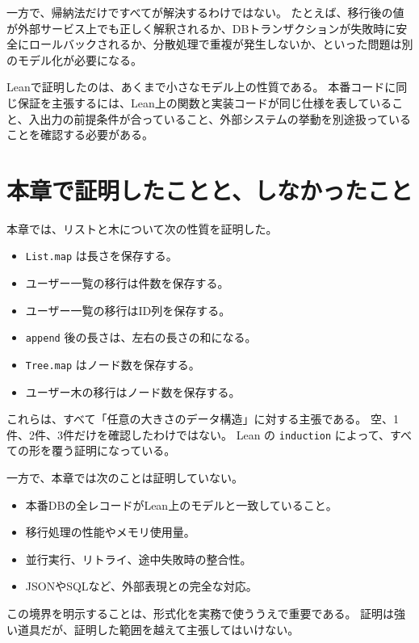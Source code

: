 一方で、帰納法だけですべてが解決するわけではない。
たとえば、移行後の値が外部サービス上でも正しく解釈されるか、DBトランザクションが失敗時に安全にロールバックされるか、分散処理で重複が発生しないか、といった問題は別のモデル化が必要になる。

\begin{warningbox}
Leanで証明したのは、あくまで小さなモデル上の性質である。
本番コードに同じ保証を主張するには、Lean上の関数と実装コードが同じ仕様を表していること、入出力の前提条件が合っていること、外部システムの挙動を別途扱っていることを確認する必要がある。
\end{warningbox}

\section{本章で証明したことと、しなかったこと}

本章では、リストと木について次の性質を証明した。

\begin{itemize}
\item \texttt{List.map} は長さを保存する。
\item ユーザー一覧の移行は件数を保存する。
\item ユーザー一覧の移行はID列を保存する。
\item \texttt{append} 後の長さは、左右の長さの和になる。
\item \texttt{Tree.map} はノード数を保存する。
\item ユーザー木の移行はノード数を保存する。
\end{itemize}

これらは、すべて「任意の大きさのデータ構造」に対する主張である。
空、1件、2件、3件だけを確認したわけではない。
Lean の \texttt{induction} によって、すべての形を覆う証明になっている。

一方で、本章では次のことは証明していない。

\begin{itemize}
\item 本番DBの全レコードがLean上のモデルと一致していること。
\item 移行処理の性能やメモリ使用量。
\item 並行実行、リトライ、途中失敗時の整合性。
\item JSONやSQLなど、外部表現との完全な対応。
\end{itemize}

この境界を明示することは、形式化を実務で使ううえで重要である。
証明は強い道具だが、証明した範囲を越えて主張してはいけない。

